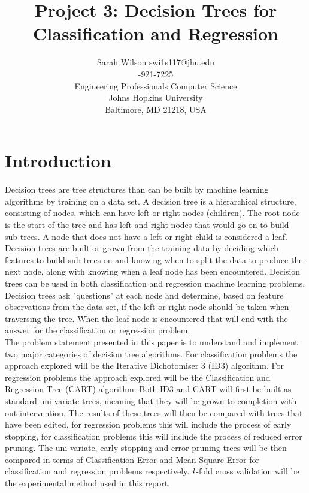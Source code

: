 \documentclass[twoside,11pt]{article}
\begin{document}
\title{Project 3: Decision Trees for Classification and Regression}

\author{\name Sarah Wilson 
	   \email swi1s117@jhu.edu \\
	   -921-7225 \\
       \addr Engineering Professionals Computer Science\\
       Johns Hopkins University\\
       Baltimore, MD 21218, USA} 

\maketitle


\section{Introduction}
\hspace*{10mm} Decision trees are tree structures than can be built by machine learning algorithms by training on a data set. A decision tree is a hierarchical structure, consisting of nodes, which can have left or right nodes (children). The root node is the start of the tree and has left and right nodes that would go on to build sub-trees. A node that does not have a left or right child is considered a leaf. Decision trees are built or grown from the training data by deciding which features to build sub-trees on and knowing when to split the data to produce the next node, along with knowing when a leaf node has been encountered. Decision trees can be used in both classification and regression machine learning problems. Decision trees ask "questions" at each node and determine, based on feature observations from the data set, if the left or right node should be taken when traversing the tree. When the leaf node is encountered that will end with the answer for the classification or regression problem.\\ 

\hspace*{5mm} The problem statement presented in this paper is to understand and implement two major categories of decision tree algorithms. For classification problems the approach explored will be the Iterative Dichotomiser 3 (ID3) algorithm. For regression problems the approach explored will be the Classification and Regression Tree (CART) algorithm. Both ID3 and CART will first be built as standard uni-variate trees, meaning that they will be grown to completion with out intervention. The results of these trees will then be compared with trees that have been edited, for regression problems this will include the process of early stopping, for classification problems this will include the process of reduced error pruning. The uni-variate, early stopping and error pruning trees will be then compared in terms of Classification Error and Mean Square Error for classification and regression problems respectively. \textit{k}-fold cross validation will be the experimental method used in this report.\\
\end{document}
